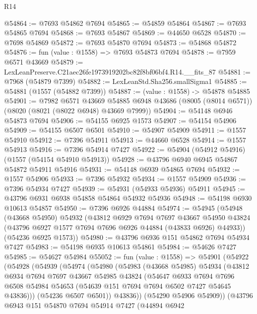 \begin{lexlean}{R14}
\begin{coremodule}
@54864 := @7693 @54862 @7694
@54865 := @54859 @54864
@54867 := @7693 @54865 @7694
@54868 := @7693 @54867
@54869 := @44650 @6528
@54870 := @7698 @54869
@54872 := @7693 @54870 @7694
@54873 := @54868 @54872
@54876 := fun (value : @1558) => @7693 @54873 @7694
@54878 := @7959 @6571 @43669
@54879 := LexLeanPreserve.C21aec26fe1973919202bc82f8bf06bf4.R14.__fits_87
@54881 := @7968 (@54879 @7399)
@54882 := LexLeanStd.Sha256.smallSigma1
@54885 := @54881 (@1557 (@54882 @7399))
@54887 := (value : @1558) -> @54878 @54885
@54901 := @7982
    @6571
    @43669
    @54885
    @6948
    @43686
    (@8005 (@8014 @6571))
    (@8020 (@8021 (@8022 @6948) @43669 @7999))
@54904 := @54148 @6946 @54873 @7694
@54906 := @54155 @6925 @1573
@54907 := @54154 @54906
@54909 := @54155 @6507 @6501
@54910 := @54907 @54909
@54911 := @1557 @54910
@54912 := @7396 @54911
@54913 := @44660 @6528
@54914 := @1557 @54913
@54916 := @7396 @54914 @7427
@54922 := @54904 (@54912 @54916) (@1557 (@54154 @54910 @54913))
@54928 := @43796 @6940 @6945 @54867 @54872 @54911 @54916
@54931 := @54148 @6939 @54865 @7694
@54932 := @1557 @54906
@54933 := @7396 @54932
@54934 := @1557 @54909
@54936 := @7396 @54934 @7427
@54939 := @54931 (@54933 @54936) @54911
@54945 := @43796 @6931 @6938 @54858 @54864 @54932 @54936
@54948 := @54198 @6930 @10613 @54857
@54950 := @7396 @6926 @44884
@54974 := @54945
    (@54948
      (@43668 @54950)
      @54932
      (@43812
        @6929
        @7694
        @7697
        @43667
        @54950
        @43824
        (@43796 @6927 @1577 @7694 @7696 @6926 @44884 (@43833 @6926) @44933))
      (@54236 @6925 @1573))
@54980 := @43796 @6936 @151 @54862 @7694 @54934 @7427
@54983 := @54198 @6935 @10613 @54861
@54984 := @54626 @7427
@54985 := @54627 @54984
@55052 := fun (value : @1558) =>
  @54901
    (@54922
      (@54928
        (@54939
          (@54974
            (@54980
              (@54983
                (@43668 @54985)
                @54934
                (@43812
                  @6934
                  @7694
                  @7697
                  @43667
                  @54985
                  @43824
                  (@54647
                    @6933
                    @7694
                    @7696
                    @6508
                    @54984
                    @54653
                    (@54639 @151 @7694 @7694 @6502 @7427 @54645 @43836)))
                (@54236 @6507 @6501))
              @43836))
          (@54290 @54906 @54909))
        (@43796
          @6943
          @151
          @54870
          @7694
          @54914
          @7427
          (@44894
            @6942

\end{coremodule}
\end{lexlean}
